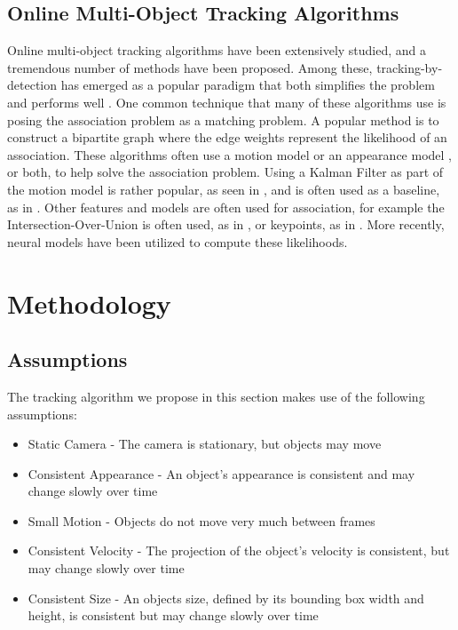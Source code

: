 \documentclass[10pt,twocolumn,letterpaper]{article}
\begin{document}
\subsection{Online Multi-Object Tracking Algorithms}
Online multi-object tracking algorithms have been extensively studied, and a tremendous number of methods have been proposed.
Among these, tracking-by-detection has emerged as a popular paradigm that both simplifies the problem and performs well \cite{detect_and_track}.
One common technique that many of these algorithms  \cite{SORT} \cite{bayesian_mot} \cite{identity_linking_under_split} \cite{detect_and_track} use is posing the association problem as a matching problem.
A popular method is to construct a bipartite graph where the edge weights represent the likelihood of an association.
These algorithms often use a motion model \cite{way_they_move} or an appearance model \cite{Tang_2019}, or both, to help solve the association problem.
Using a Kalman Filter as part of the motion model is rather popular, as seen in \cite{SORT}, and is often used as a baseline, as in \cite{rnn_track}.
Other features and models are often used for association, for example the Intersection-Over-Union is often used, as in \cite{SORT}, or keypoints, as in \cite{in_the_wild}.
More recently, neural models have been utilized \cite{DEEPSORT} \cite{rnn_track} \cite{detect_and_track} to compute these likelihoods.


\label{methodology_section}
\section{Methodology}


\subsection{Assumptions}
The tracking algorithm we propose in this section makes use of the following assumptions:
\begin{itemize}
\item Static Camera - The camera is stationary, but objects may move
\item Consistent Appearance - An object's appearance is consistent and may change slowly over time
\item Small Motion - Objects do not move very much between frames
\item Consistent Velocity - The projection of the object's velocity is consistent, but may change slowly over time
\item Consistent Size - An objects size, defined by its bounding box width and height, is consistent but may change slowly over time
\end{itemize}
\end{document}
